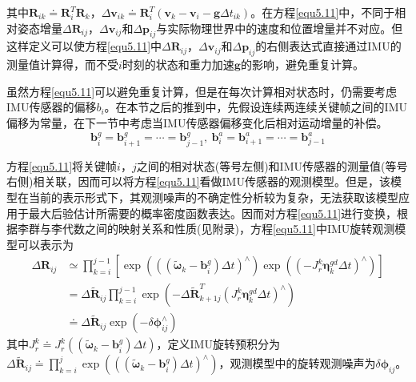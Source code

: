 其中$\boldsymbol{R}_{ik} \doteq \boldsymbol{R}_i^T \boldsymbol{R}_k$，$\Delta \boldsymbol{v}_{ik} \doteq \boldsymbol{R}_i^T \left( \boldsymbol{v}_k -\boldsymbol{v}_i-\boldsymbol{g}\Delta t_{ik} \right)$。在方程\eqref{equ5.11}中，不同于相对姿态增量$\Delta \boldsymbol{R}_{ij}$，$\Delta \boldsymbol{v}_{ij}$和$\Delta \boldsymbol{p}_{ij}$与实际物理世界中的速度和位置增量并不对应。但这样定义可以使方程\eqref{equ5.11}中$\Delta \boldsymbol{R}_{ij}$，$\Delta \boldsymbol{v}_{ij}$和$\Delta \boldsymbol{p}_{ij}$的右侧表达式直接通过IMU的测量值计算得，而不受$i$时刻的状态和重力加速$\boldsymbol{g}$的影响，避免重复计算。

虽然方程\eqref{equ5.11}可以避免重复计算，但是在每次计算相对状态时，仍需要考虑IMU传感器的偏移$b_i$。在本节之后的推到中，先假设连续两连续关键帧之间的IMU偏移为常量，在下一节中考虑当IMU传感器偏移变化后相对运动增量的补偿。
\begin{equation}
\label{equ5.12}
\boldsymbol{b}_i^g = \boldsymbol{b}_{i+1}^g = \cdots = \boldsymbol{b}_{j-1}^g, \  \boldsymbol{b}_i^a = \boldsymbol{b}_{i+1}^a = \cdots = \boldsymbol{b}_{j-1}^a
\end{equation}

方程\eqref{equ5.11}将关键帧$i$，$j$之间的相对状态(等号左侧)和IMU传感器的测量值(等号右侧)相关联，因而可以将方程\eqref{equ5.11}看做IMU传感器的观测模型。但是，该模型在当前的表示形式下，其观测噪声的不确定性分析较为复杂，无法获取该模型应用于最大后验估计所需要的概率密度函数表达。因而对方程\eqref{equ5.11}进行变换，根据李群与李代数之间的映射关系和性质(见附录)，方程\eqref{equ5.11}中IMU旋转观测模型可以表示为
\begin{equation}
\label{equ5.13}
\begin{aligned}
\Delta \boldsymbol{R}_{ij} & \simeq \prod\limits_{k=i}^{j-1} \left[ \exp \left( \left( \left( \widetilde{\boldsymbol{\omega}}_k - \boldsymbol{b}_i^g \right) \Delta t \right)^{\wedge}  \right)  
\exp \left( \left( -J_r^k \boldsymbol{\eta}_k^{gd} \Delta t \right)^{\wedge} \right)\right] \\
&= \Delta \widetilde{\boldsymbol{R}}_{ij} \prod\limits_{k=i}^{j-1}\exp \left( -\Delta \widetilde{\boldsymbol{R}}_{k+1j}^T \left( J_r^k \boldsymbol{\eta}_k^{gd} \Delta t \right)^{\wedge}  \right) \\ 
& \doteq \Delta \widetilde{\boldsymbol{R}}_{ij} \exp \left(  -\delta \boldsymbol{\phi}_{ij} ^{\wedge}  \right)
\end{aligned}
\end{equation}
其中$J_r^k \doteq J_r^k( \left( \widetilde{\boldsymbol{\omega}}_k - \boldsymbol{b}_i^g \right) \Delta t)$，定义IMU旋转预积分为$\Delta \widetilde{\boldsymbol{R}}_{ij} \doteq \prod_{k=i}^j\exp \left( \left( \left( \widetilde{\boldsymbol{\omega}}_k - \boldsymbol{b}_i^g \right) \Delta t \right)^{\wedge}  \right)$，观测模型中的旋转观测噪声为$\delta \boldsymbol{\phi}_{ij}$。

